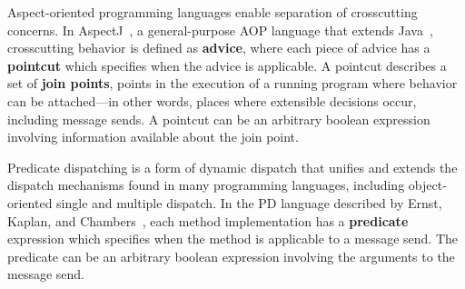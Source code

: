 \documentclass{acm_proc_article-sp}
\newcommand{\defn}[1]{\textbf{#1}}
\begin{document}
Aspect-oriented programming languages enable separation of
crosscutting concerns.  In AspectJ~\cite{kiczales01overview}, a
general-purpose AOP language that extends Java~\cite{JLS},
crosscutting behavior is defined as \defn{advice}, where each piece of
advice has a \defn{pointcut} which specifies when the advice is
applicable.  A pointcut describes a set of \defn{join points}, points
in the execution of a running program where behavior can be
attached---in other words, places where extensible decisions occur,
including message sends.  A pointcut can be an arbitrary boolean
expression involving information available about the join point.

Predicate dispatching is a form of dynamic dispatch that unifies and
extends the dispatch mechanisms found in many programming languages,
including object-oriented single and multiple dispatch.  In the PD
language described by Ernst, Kaplan, and
Chambers~\cite{predicate-dispatching}, each method implementation has
a \defn{predicate} expression which specifies when the method is
applicable to a message send.  The predicate can be an arbitrary
boolean expression involving the arguments to the message send.
\end{document}
